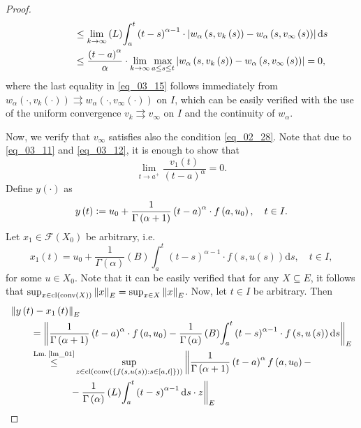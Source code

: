 \documentclass[reqno]{amsart}
\numberwithin{equation}{section}
\theoremstyle{definition}
\theoremstyle{remark}
\newcommand{\Bint}[3]{\br{B}\!\displaystyle\int_{#1}^{#2}{#3}}
\newcommand{\br}[1]{\left(#1\right)}
\newcommand{\cbr}[1]{\left\{#1\right\}}
\newcommand{\cl}[1]{\clOperator\br{#1}}
\newcommand{\conv}[1]{\convOperator\br{#1}}
\newcommand{\defeq}{\vcentcolon=}
\newcommand{\ds}{\mathrm{d}s}
\newcommand{\fF}{\mathcal{F}}
\newcommand{\leqText}[1]{\stackrel{#1}{\leq}}
\newcommand{\Lint}[3]{\br{L}\!\displaystyle\int_{#1}^{#2}{#3}}
\newcommand{\lmRef}[1]{\textrm{Lm.\,\ref{#1}}}
\newcommand{\sbr}[1]{\left[#1\right]}
\newcommand{\st}{\!:}
\DeclareMathOperator{\clOperator}{cl}
\DeclareMathOperator{\convOperator}{conv}
\begin{document}
\begin{proof}
\begin{equation}
\begin{aligned}
			&\qquad\qquad\leq\lim_{k\rightarrow\infty}\Lint{a}{t}{\br{t-s}^{\alpha-1}\cdot\abs{w_{\alpha}\br{s,v_k\br{s}}-w_{\alpha}\br{s,v_{\infty}\br{s}}}\,\ds}\\
			&\qquad\qquad\leq\frac{\br{t-a}^{\alpha}}{\alpha}\cdot\lim_{k\rightarrow\infty}\max_{a\leq{s}\leq{t}}\abs{w_{\alpha}\br{s,v_k\br{s}}-w_{\alpha}\br{s,v_{\infty}\br{s}}}=0,
		\end{aligned}
	\end{equation}
	where the last equality in \eqref{eq_03_15} follows immediately from $w_{\alpha}\br{\cdot,v_k\br{\cdot}}\rightrightarrows{w}_{\alpha}\br{\cdot,v_{\infty}\br{\cdot}}$ on $I$, which can be easily verified with the use of the uniform convergence $v_k\rightrightarrows{v_{\infty}}$ on $I$ and the continuity of $w_{\alpha}$.
	
	Now, we verify that $v_{\infty}$ satisfies also the condition \eqref{eq_02_28}. Note that due to \eqref{eq_03_11} and \eqref{eq_03_12}, it is enough to show that
	\begin{equation}\label{eq_03_16}
		\lim_{t\rightarrow{a}^+}\frac{v_1\br{t}}{\br{t-a}^{\alpha}}=0.
	\end{equation}
	Define $y\br{\cdot}$ as
	\begin{equation*}
		y\br{t}\defeq{u}_0+\frac{1}{\Gamma\br{\alpha+1}}\br{t-a}^{\alpha}\cdot{f}\br{a,u_0},\quad{t}\in{I}.
	\end{equation*}
	Let $x_1\in\fF\br{X_0}$ be arbitrary, i.e.
	\begin{equation*}
		x_1\br{t}=u_0+\frac{1}{\Gamma\br{\alpha}}\Bint{a}{t}{\br{t-s}^{\alpha-1}\cdot{f}\br{s,u\br{s}}\ds},\quad{t}\in{I},
	\end{equation*}
	for some $u\in{X}_0$. Note that it can be easily verified that for any $X\subseteq{E}$, it follows that $\sup_{x\in\cl{\conv{X}}}\norm{x}_E=\sup_{x\in{X}}\norm{x}_E$. Now, let $t\in{I}$ be arbitrary. Then
	\begin{equation}\label{eq_03_17}
		\begin{aligned}
			&\norm{y\br{t}-x_1\br{t}}_E\\
			&\qquad=\norm{\frac{1}{\Gamma\br{\alpha+1}}\br{t-a}^{\alpha}\cdot{f}\br{a,u_0}-\frac{1}{\Gamma\br{\alpha}}\Bint{a}{t}{\br{t-s}^{\alpha-1}\cdot{f}\br{s,u\br{s}}\ds}}_E\\
			&\qquad\leqText{\lmRef{lm_01}}\!\sup_{z\in\cl{\conv{\cbr{f\br{s,u\br{s}}\,\st{s}\in\sbr{a,t}}}}}\bigg\|\frac{1}{\Gamma\br{\alpha+1}}\br{t-a}^{\alpha}f\br{a,u_0}-\\
			&\qquad\qquad\qquad-\frac{1}{\Gamma\br{\alpha}}\Lint{a}{t}{\br{t-s}^{\alpha-1}\ds}\cdot{z}\bigg\|_E\\

\end{aligned}
\end{equation}
\end{proof}
\end{document}
